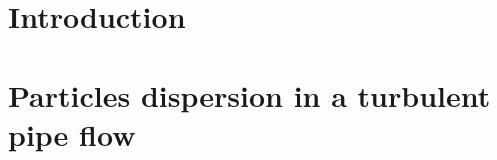 \documentclass[a4paper,10pt,twoside]{csdoc}
\begin{document}
\def\contentsname{\textbf{\normalsize TABLE OF CONTENTS}\pdfbookmark[1]{Table of
contents}{contents}}
\def\indexname{Index of the main variables and keywords}

\large
\makepdgCS
\normalsize

\begin{center}\begin{singlespace}
\tableofcontents
\end{singlespace}\end{center}



\passepage
{}
\part{Introduction}

\setcounter{section}{0}
\part{Particles dispersion in a turbulent pipe flow}







\end{document}
